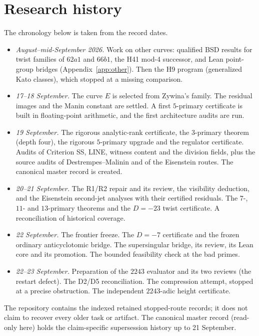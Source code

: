 \section{Research history}\label{app:history}

The chronology below is taken from the record dates.

\begin{itemize}[leftmargin=*]
\item \emph{August--mid-September 2026.} Work on other curves: qualified BSD results for twist families of $62a1$ and $66b1$, the H41 mod-4 successor, and Lean point-group bridges (Appendix~\ref{app:other}). Then the H9 program (generalized Kato classes), which stopped at a missing comparison.
\item \emph{17--18 September.} The curve $E$ is selected from Zywina's family. The residual images and the Manin constant are settled. A first $5$-primary certificate is built in floating-point arithmetic, and the first architecture audits are run.
\item \emph{19 September.} The rigorous analytic-rank certificate, the $3$-primary theorem (depth four), the rigorous $5$-primary upgrade and the regulator certificate. Audits of Criterion SS, LINE, witness content and the division fields, plus the source audits of Destrempes--Malinin and of the Eisenstein routes. The canonical master record is created.
\item \emph{20--21 September.} The R1/R2 repair and its review, the visibility deduction, and the Eisenstein second-jet analyses with their certified residuals. The $7$-, $11$- and $13$-primary theorems and the $D=-23$ twist certificate. A reconciliation of historical coverage.
\item \emph{22 September.} The frontier freeze. The $D=-7$ certificate and the frozen ordinary anticyclotomic bridge. The supersingular bridge, its review, its Lean core and its promotion. The bounded feasibility check at the bad primes.
\item \emph{22--23 September.} Preparation of the $2243$ evaluator and its two reviews (the restart defect). The D2/D5 reconciliation. The compression attempt, stopped at a precise obstruction. The independent $2243$-adic height certificate.
\end{itemize}

The repository contains the indexed retained stopped-route records; it does not claim to recover every older task or artifact. The canonical master record (read-only here) holds the claim-specific supersession history up to 21 September.
